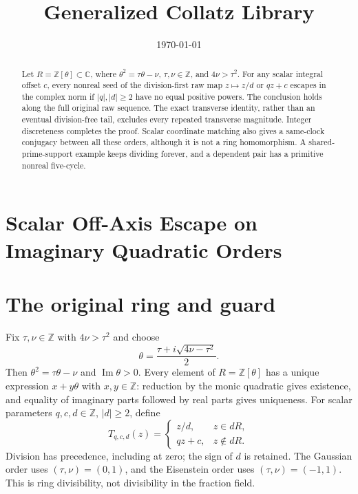 \documentclass[11pt,letterpaper]{article}
\title{Generalized Collatz Library}
\author{}
\date{\today}
\newcommand{\Z}{\mathbb{Z}}
\newcommand{\C}{\mathbb{C}}
\begin{document}
\maketitle
\section*{Scalar Off-Axis Escape on Imaginary Quadratic Orders}

\begin{abstract}
Let \(R=\Z[\theta]\subset\C\), where
\(\theta^2=\tau\theta-\nu\), \(\tau,\nu\in\Z\), and \(4\nu>\tau^2\).
For any scalar integral offset \(c\), every nonreal seed of the division-first
raw map \(z\mapsto z/d\) or \(qz+c\) escapes in the complex norm if
\(|q|,|d|\ge2\) have no equal positive powers. The conclusion holds along
the full original raw sequence. The exact transverse identity, rather than
an eventual division-free tail, excludes every repeated transverse magnitude.
Integer discreteness completes the proof. Scalar coordinate matching also
gives a same-clock conjugacy between all these orders, although it is not
a ring homomorphism. A shared-prime-support example keeps dividing forever,
and a dependent pair has a primitive nonreal five-cycle.
\end{abstract}

\section{The original ring and guard}

Fix \(\tau,\nu\in\Z\) with \(4\nu>\tau^2\) and choose
\[
\theta=\frac{\tau+i\sqrt{4\nu-\tau^2}}2.
\]
Then \(\theta^2=\tau\theta-\nu\) and \(\operatorname{Im}\theta>0\).
Every element of \(R=\Z[\theta]\) has a unique expression \(x+y\theta\)
with \(x,y\in\Z\): reduction by the monic quadratic gives existence,
and equality of imaginary parts followed by real parts gives uniqueness.
For scalar parameters \(q,c,d\in\Z\), \(|d|\ge2\), define
\[
T_{q,c,d}(z)=
\begin{cases}
z/d,&z\in dR,\\
qz+c,&z\notin dR.
\end{cases}
\]
Division has precedence, including at zero; the sign of \(d\) is retained.
The Gaussian order uses \((\tau,\nu)=(0,1)\), and the Eisenstein order
uses \((\tau,\nu)=(-1,1)\). This is ring divisibility, not divisibility
in the fraction field.
\end{document}
